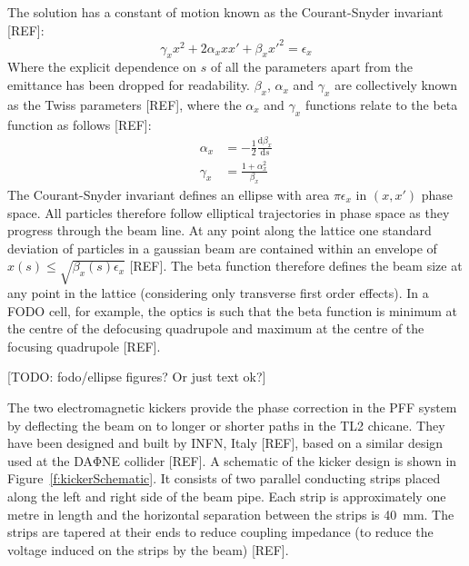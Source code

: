 The solution has a constant of motion known as the Courant-Snyder invariant [REF]:
\begin{equation}
\gamma_x x^2 + 2\alpha_x x x' + \beta_x x'^2 = \epsilon_x 
\end{equation}
Where the explicit dependence on \(s\) of all the parameters apart from the emittance has been dropped for readability. \(\beta_{x}\), \(\alpha_{x}\) and \(\gamma_{x}\) are collectively known as the Twiss parameters [REF], where the \(\alpha_x\) and \(\gamma_x\) functions relate to the beta function as follows [REF]:
\begin{align}
\alpha_x &= -\frac{1}{2}\frac{\mathrm{d}\beta_x}{\mathrm{d}s} \\
\gamma_x &= \frac{1+\alpha_x^2}{\beta_x}
\end{align}
The Courant-Snyder invariant defines an ellipse with area \(\pi\epsilon_x\) in \((x, x')\) phase space. All particles therefore follow elliptical trajectories in phase space as they progress through the beam line. At any point along the lattice one standard deviation of particles in a gaussian beam are contained within an envelope of \(x(s) \leq \sqrt{\beta_x(s)\epsilon_x}\) [REF]. The beta function therefore defines the beam size at any point in the lattice (considering only transverse first order effects). In a FODO cell, for example, the optics is such that the beta function is minimum at the centre of the defocusing quadrupole and maximum at the centre of the focusing quadrupole [REF].

[TODO: fodo/ellipse figures? Or just text ok?]


The two electromagnetic kickers provide the phase correction in the PFF system by deflecting the beam on to longer or shorter paths in the TL2 chicane. They have been designed and built by INFN, Italy [REF], based on a similar design used at the DA\(\mathrm{\Phi}\)NE collider [REF]. A schematic of the kicker design is shown in Figure~\ref{f:kickerSchematic}. It consists of two parallel conducting strips placed along the left and right side of the beam pipe. Each strip is approximately one metre in length and the horizontal separation between the strips is 40~mm. The strips are tapered at their ends to reduce coupling impedance (to reduce the voltage induced on the strips by the beam) [REF].

